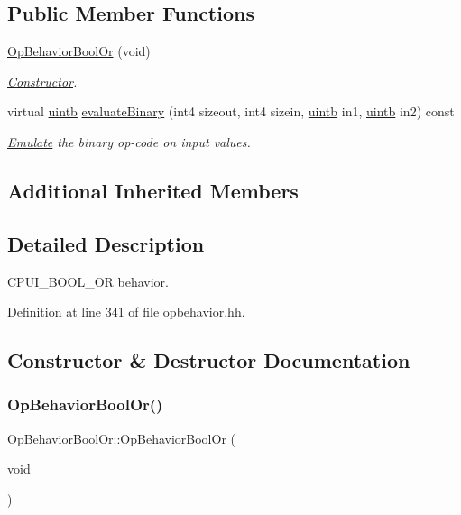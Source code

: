 \subsection*{Public Member Functions}
\begin{DoxyCompactItemize}
\item 
\mbox{\hyperlink{class_op_behavior_bool_or_a1b1aab63210185c1651b2ec0ae03c4cd}{Op\+Behavior\+Bool\+Or}} (void)
\begin{DoxyCompactList}\small\item\em \mbox{\hyperlink{class_constructor}{Constructor}}. \end{DoxyCompactList}\item 
virtual \mbox{\hyperlink{types_8h_a2db313c5d32a12b01d26ac9b3bca178f}{uintb}} \mbox{\hyperlink{class_op_behavior_bool_or_a111014e12798e842950bea2a202176de}{evaluate\+Binary}} (int4 sizeout, int4 sizein, \mbox{\hyperlink{types_8h_a2db313c5d32a12b01d26ac9b3bca178f}{uintb}} in1, \mbox{\hyperlink{types_8h_a2db313c5d32a12b01d26ac9b3bca178f}{uintb}} in2) const
\begin{DoxyCompactList}\small\item\em \mbox{\hyperlink{class_emulate}{Emulate}} the binary op-\/code on input values. \end{DoxyCompactList}\end{DoxyCompactItemize}
\subsection*{Additional Inherited Members}


\subsection{Detailed Description}
C\+P\+U\+I\+\_\+\+B\+O\+O\+L\+\_\+\+OR behavior. 

Definition at line 341 of file opbehavior.\+hh.



\subsection{Constructor \& Destructor Documentation}
\mbox{\label{class_op_behavior_bool_or_a1b1aab63210185c1651b2ec0ae03c4cd}} 
\subsubsection{\texorpdfstring{OpBehaviorBoolOr()}{OpBehaviorBoolOr()}}
{\footnotesize\ttfamily Op\+Behavior\+Bool\+Or\+::\+Op\+Behavior\+Bool\+Or (\begin{DoxyParamCaption}\item[{void}]{ }\end{DoxyParamCaption})\hspace{0.3cm}{\ttfamily [inline]}}



